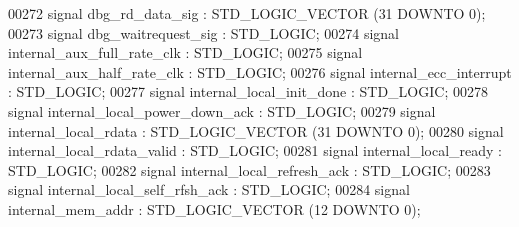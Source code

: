 \begin{DoxyCode}
00272                 \textcolor{keywordflow}{signal} \textcolor{vhdlchar}{dbg_rd_data_sig} \textcolor{vhdlchar}{:}  \textcolor{comment}{STD\_LOGIC\_VECTOR} \textcolor{vhdlchar}{(}\textcolor{vhdllogic}{}\textcolor{vhdllogic}{31} \textcolor{keywordflow}{DOWNTO} \textcolor{vhdllogic}{}\textcolor{vhdllogic}{0}\textcolor{vhdlchar}{)};
00273                 \textcolor{keywordflow}{signal} \textcolor{vhdlchar}{dbg_waitrequest_sig} \textcolor{vhdlchar}{:}  \textcolor{comment}{STD\_LOGIC};
00274                 \textcolor{keywordflow}{signal} \textcolor{vhdlchar}{internal_aux_full_rate_clk} \textcolor{vhdlchar}{:}  \textcolor{comment}{STD\_LOGIC};
00275                 \textcolor{keywordflow}{signal} \textcolor{vhdlchar}{internal_aux_half_rate_clk} \textcolor{vhdlchar}{:}  \textcolor{comment}{STD\_LOGIC};
00276                 \textcolor{keywordflow}{signal} \textcolor{vhdlchar}{internal_ecc_interrupt} \textcolor{vhdlchar}{:}  \textcolor{comment}{STD\_LOGIC};
00277                 \textcolor{keywordflow}{signal} \textcolor{vhdlchar}{internal_local_init_done} \textcolor{vhdlchar}{:}  \textcolor{comment}{STD\_LOGIC};
00278                 \textcolor{keywordflow}{signal} \textcolor{vhdlchar}{internal_local_power_down_ack} \textcolor{vhdlchar}{:}  \textcolor{comment}{STD\_LOGIC};
00279                 \textcolor{keywordflow}{signal} \textcolor{vhdlchar}{internal_local_rdata} \textcolor{vhdlchar}{:}  \textcolor{comment}{STD\_LOGIC\_VECTOR} \textcolor{vhdlchar}{(}\textcolor{vhdllogic}{}\textcolor{vhdllogic}{31} \textcolor{keywordflow}{DOWNTO} \textcolor{vhdllogic}{}\textcolor{vhdllogic}{0}\textcolor{vhdlchar}{)};
00280                 \textcolor{keywordflow}{signal} \textcolor{vhdlchar}{internal_local_rdata_valid} \textcolor{vhdlchar}{:}  \textcolor{comment}{STD\_LOGIC};
00281                 \textcolor{keywordflow}{signal} \textcolor{vhdlchar}{internal_local_ready} \textcolor{vhdlchar}{:}  \textcolor{comment}{STD\_LOGIC};
00282                 \textcolor{keywordflow}{signal} \textcolor{vhdlchar}{internal_local_refresh_ack} \textcolor{vhdlchar}{:}  \textcolor{comment}{STD\_LOGIC};
00283                 \textcolor{keywordflow}{signal} \textcolor{vhdlchar}{internal_local_self_rfsh_ack} \textcolor{vhdlchar}{:}  \textcolor{comment}{STD\_LOGIC};
00284                 \textcolor{keywordflow}{signal} \textcolor{vhdlchar}{internal_mem_addr} \textcolor{vhdlchar}{:}  \textcolor{comment}{STD\_LOGIC\_VECTOR} \textcolor{vhdlchar}{(}\textcolor{vhdllogic}{}\textcolor{vhdllogic}{12} \textcolor{keywordflow}{DOWNTO} \textcolor{vhdllogic}{}\textcolor{vhdllogic}{0}\textcolor{vhdlchar}{)};

\end{DoxyCode}
